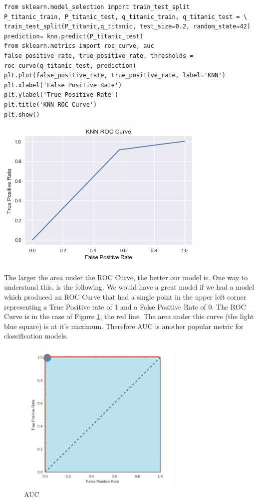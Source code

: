 \documentclass[11pt]{article}
\begin{document}
\begin{verbatim}
from sklearn.model_selection import train_test_split
P_titanic_train, P_titanic_test, q_titanic_train, q_titanic_test = \
train_test_split(P_titanic,q_titanic, test_size=0.2, random_state=42)
prediction= knn.predict(P_titanic_test)
from sklearn.metrics import roc_curve, auc
false_positive_rate, true_positive_rate, thresholds = roc_curve(q_titanic_test, prediction)
plt.plot(false_positive_rate, true_positive_rate, label='KNN')
plt.xlabel('False Positive Rate')
plt.ylabel('True Positive Rate')
plt.title('KNN ROC Curve')
plt.show()

\end{verbatim}

\begin{center}
\includegraphics[width=.9\linewidth]{obipy-resources/b948b903cfc3de03a79616959b021996-13770zE.png}
\end{center}

The larger the area under the ROC Curve, the better our model is. One way to understand this, is the following. We would have a great model if we had a model which produced an ROC Curve that had a single point in the upper left corner representing a True Positive rate of 1 and a False Positive Rate of 0. The ROC Curve is in the case of Figure \ref{tab:auc}, the red line. The area under this curve (the light blue square) is at it's maximum. Therefore AUC is another popular metric for classification  models. 

\begin{figure}[htbp]
\centering
\includegraphics[width=300px]{./AUC2.png}
\caption{\label{tab:auc}
AUC}
\end{figure}
\end{document}
